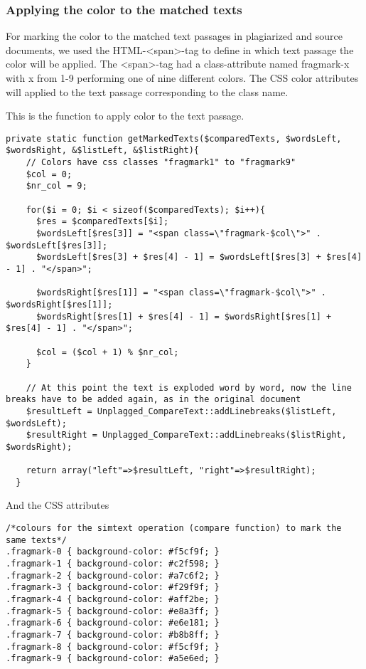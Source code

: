 \subsubsection{Applying the color to the matched texts}

For marking the color to the matched text passages in plagiarized and source documents, we used the HTML-<span>-tag to define in which text passage the color will be applied. The <span>-tag had a class-attribute named fragmark-x with x from 1-9 performing one of nine different colors. The CSS color attributes will applied to the text passage corresponding to the class name.

This is the function to apply color to the text passage.

\begin{lstlisting}[caption=Cropping an image to a square aspect ratio]
private static function getMarkedTexts($comparedTexts, $wordsLeft, $wordsRight, &$listLeft, &$listRight){
    // Colors have css classes "fragmark1" to "fragmark9"
    $col = 0;
    $nr_col = 9;
    
    for($i = 0; $i < sizeof($comparedTexts); $i++){
      $res = $comparedTexts[$i];
      $wordsLeft[$res[3]] = "<span class=\"fragmark-$col\">" . $wordsLeft[$res[3]];
      $wordsLeft[$res[3] + $res[4] - 1] = $wordsLeft[$res[3] + $res[4] - 1] . "</span>";

      $wordsRight[$res[1]] = "<span class=\"fragmark-$col\">" . $wordsRight[$res[1]];
      $wordsRight[$res[1] + $res[4] - 1] = $wordsRight[$res[1] + $res[4] - 1] . "</span>";

      $col = ($col + 1) % $nr_col;
    }
    
    // At this point the text is exploded word by word, now the line breaks have to be added again, as in the original document
    $resultLeft = Unplagged_CompareText::addLinebreaks($listLeft, $wordsLeft);
    $resultRight = Unplagged_CompareText::addLinebreaks($listRight, $wordsRight);

    return array("left"=>$resultLeft, "right"=>$resultRight);
  }
\end{lstlisting}

And the CSS attributes

\begin{lstlisting}[caption=Cropping an image to a square aspect ratio]
/*colours for the simtext operation (compare function) to mark the same texts*/
.fragmark-0 { background-color: #f5cf9f; }
.fragmark-1 { background-color: #c2f598; }
.fragmark-2 { background-color: #a7c6f2; }
.fragmark-3 { background-color: #f29f9f; }
.fragmark-4 { background-color: #aff2be; }
.fragmark-5 { background-color: #e8a3ff; }
.fragmark-6 { background-color: #e6e181; }
.fragmark-7 { background-color: #b8b8ff; }
.fragmark-8 { background-color: #f5cf9f; }
.fragmark-9 { background-color: #a5e6ed; }
\end{lstlisting}